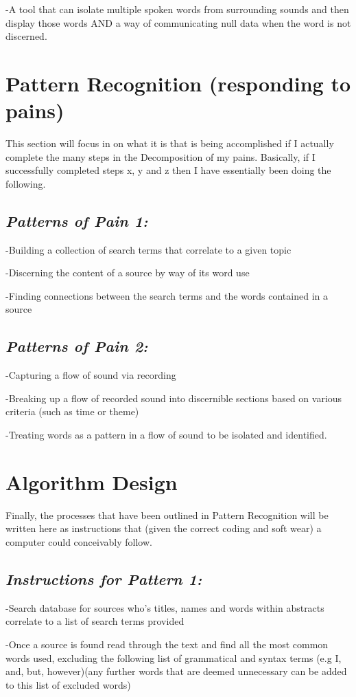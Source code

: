 \documentclass{article}
\begin{document}
-A tool that can isolate multiple spoken words from surrounding sounds and then display those words AND a way of communicating null data when the word is not discerned.

\section*{Pattern Recognition (responding to pains)}
This section will focus in on what it is that is being accomplished if I actually complete the many steps in the Decomposition of my pains. Basically, if I successfully completed steps x, y and z then I have essentially been doing the following.
\subsection*{\textit{Patterns of Pain 1:}}
-Building a collection of search terms that correlate to a given topic

-Discerning the content of a source by way of its word use

-Finding connections between the search terms and the words contained in a source

\subsection*{\textit{Patterns of Pain 2:}}
-Capturing a flow of sound via recording

-Breaking up a flow of recorded sound into discernible sections based on various criteria (such as time or theme)

-Treating words as a pattern in a flow of sound to be isolated and identified.
\section*{Algorithm Design}
Finally, the processes that have been outlined in Pattern Recognition will be written here as instructions that (given the correct coding and soft wear) a computer could conceivably follow.

\subsection*{\textit{Instructions for Pattern 1:}}
-Search database for sources who's titles, names and words within abstracts  correlate to a list of search terms provided

-Once a source is found read through the text and find all the most common words used, excluding the following list of grammatical and syntax terms (e.g I, and, but, however)(any further words that are deemed unnecessary can be added to this list of excluded words)
\end{document}
